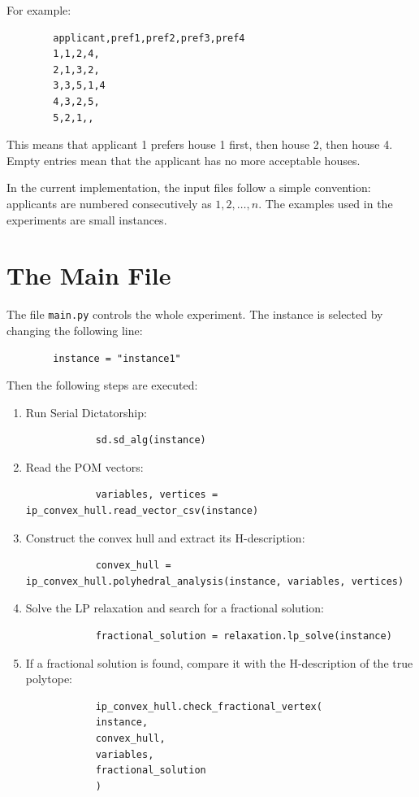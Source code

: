 \documentclass[12pt]{report}
\numberwithin{algorithm}{chapter}
\begin{document}
	For example:
	
	\begin{verbatim}
		applicant,pref1,pref2,pref3,pref4
		1,1,2,4,
		2,1,3,2,
		3,3,5,1,4
		4,3,2,5,
		5,2,1,,
	\end{verbatim}
	
	This means that applicant 1 prefers house 1 first, then house 2, then house 4. Empty entries mean that the applicant has no more acceptable houses.
	
	In the current implementation, the input files follow a simple convention: applicants are numbered consecutively as \(1,2,\ldots,n\). The examples used in the experiments are small instances.
	
	\section{The Main File}
	
	The file \texttt{main.py} controls the whole experiment. The instance is selected by changing the following line:
	
	\begin{verbatim}
		instance = "instance1"
	\end{verbatim}
	
	Then the following steps are executed:
	
	\begin{enumerate}
		\item Run Serial Dictatorship:
		\begin{verbatim}
			sd.sd_alg(instance)
		\end{verbatim}
		
		\item Read the POM vectors:
		\begin{verbatim}
			variables, vertices = ip_convex_hull.read_vector_csv(instance)
		\end{verbatim}
		
		\item Construct the convex hull and extract its H-description:
		\begin{verbatim}
			convex_hull = ip_convex_hull.polyhedral_analysis(instance, variables, vertices)
		\end{verbatim}
		
		\item Solve the LP relaxation and search for a fractional solution:
		\begin{verbatim}
			fractional_solution = relaxation.lp_solve(instance)
		\end{verbatim}
		
		\item If a fractional solution is found, compare it with the H-description of the true polytope:
		\begin{verbatim}
			ip_convex_hull.check_fractional_vertex(
			instance,
			convex_hull,
			variables,
			fractional_solution
			)
		\end{verbatim}
	\end{enumerate}
	
\end{document}
